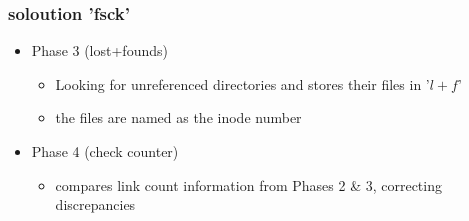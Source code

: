 \documentclass[draft,handout]{beamer}
\begin{document}
        \begin{frame}
			\frametitle{soloution 'fsck'}
            \begin{itemize}
                \item<3-> Phase 3 (lost+founds)
                \begin{itemize}
                    \item<3-> Looking for unreferenced directories and stores their files in '$l+f$'
                    \item<3-> the files are named as the inode number
                \end{itemize}
                \item<1-> Phase 4 (check counter)
                \begin{itemize}
                    \item<1-> compares link count information from Phases 2 \& 3, correcting discrepancies
                \end{itemize}
            \end{itemize}
		\end{frame}
\end{document}
